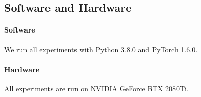 \documentclass{article}
\def\*#1{\mathbf{#1}}
\begin{document}





\subsection{Software and Hardware}
\paragraph{Software} We run all experiments with Python 3.8.0 and PyTorch 1.6.0.
\paragraph{Hardware} All experiments are run on NVIDIA GeForce RTX 2080Ti.


\end{document}
